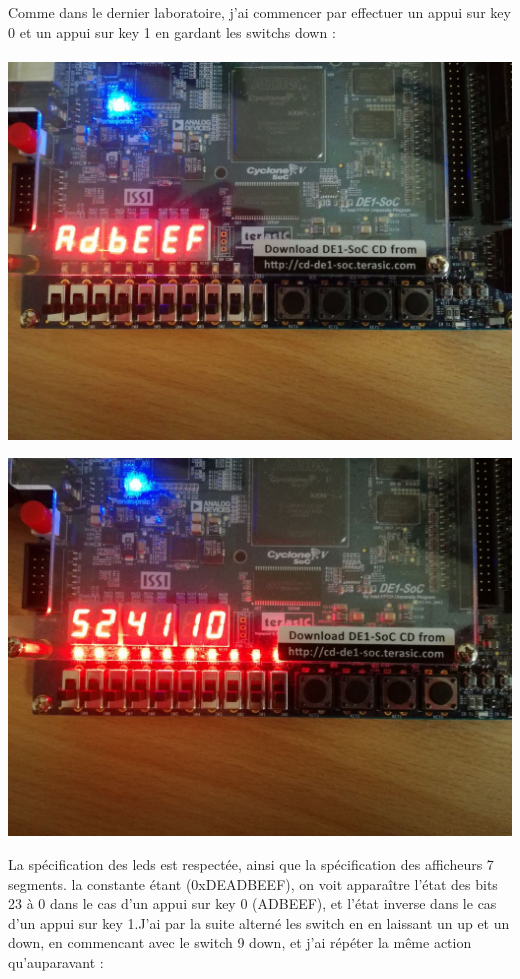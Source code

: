 Comme dans le dernier laboratoire, j'ai commencer par effectuer un appui sur key 0 et un appui sur key 1 en gardant les switchs down : \\\\
\includegraphics[scale=0.3]{./images/testp1.jpeg}

\includegraphics[scale=0.3]{./images/testp2.jpeg}

La spécification des leds est respectée, ainsi que la spécification des afficheurs 7 segments. la constante étant (0xDEADBEEF), on voit apparaître l'état des bits 23 à 0 dans le cas d'un appui sur key 0 (ADBEEF), et l'état inverse dans le cas d'un appui sur key 1.J'ai par la suite alterné les switch en en laissant un up et un down, en commencant avec le switch 9 down, et j'ai répéter la même action qu'auparavant :

